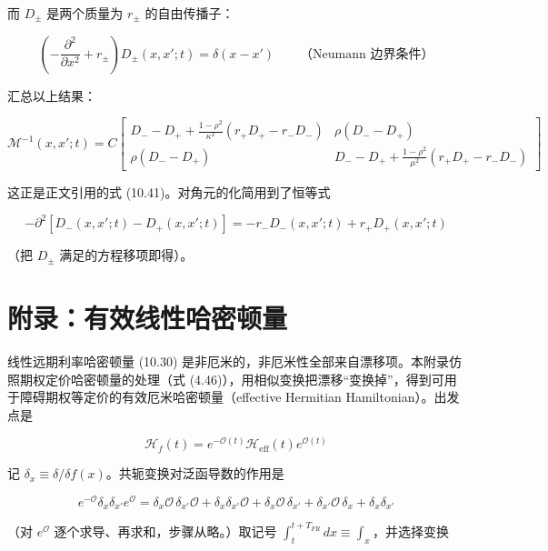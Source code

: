 而 $D_\pm$ 是两个质量为 $r_\pm$ 的自由传播子：

\begin{equation*}
\left(-\frac{\partial^2}{\partial x^2}+r_\pm\right)D_\pm(x,x';t)=\delta(x-x')\qquad\text{（Neumann 边界条件）}
\end{equation*}

汇总以上结果：

\begin{equation*}
\mathcal{M}^{-1}(x,x';t)=
C\begin{bmatrix}
D_--D_+ + \frac{1-\rho^2}{\kappa^2}(r_+D_+-r_-D_-) & \rho(D_--D_+)\\[6pt]
\rho(D_--D_+) & D_--D_+ + \frac{1-\rho^2}{\mu^2}(r_+D_+-r_-D_-)
\end{bmatrix}
\tag{10.73}
\end{equation*}

这正是正文引用的式 (10.41)。对角元的化简用到了恒等式

\begin{equation*}
-\partial^2\left[D_-(x,x';t)-D_+(x,x';t)\right]=-r_-D_-(x,x';t)+r_+D_+(x,x';t)
\end{equation*}

（把 $D_\pm$ 满足的方程移项即得）。

\section{附录：有效线性哈密顿量}

线性远期利率哈密顿量 (10.30) 是非厄米的，非厄米性全部来自漂移项。本附录仿照期权定价哈密顿量的处理（式 (4.46)），用相似变换把漂移“变换掉”，得到可用于障碍期权等定价的有效厄米哈密顿量（effective Hermitian Hamiltonian）。出发点是

\begin{equation*}
\mathcal{H}_f(t)=e^{-\mathcal{O}(t)}\mathcal{H}_{\text{eff}}(t)e^{\mathcal{O}(t)}
\tag{10.74}
\end{equation*}

记 $\delta_x\equiv\delta/\delta f(x)$。共轭变换对泛函导数的作用是

\begin{equation*}
e^{-\mathcal{O}}\delta_x\delta_{x'}e^{\mathcal{O}}
=\delta_x\mathcal{O}\,\delta_{x'}\mathcal{O}+\delta_x\delta_{x'}\mathcal{O}+\delta_x\mathcal{O}\,\delta_{x'}+\delta_{x'}\mathcal{O}\,\delta_x+\delta_x\delta_{x'}
\end{equation*}

（对 $e^{\mathcal{O}}$ 逐个求导、再求和，步骤从略。）取记号 $\int_t^{t+T_{FR}}dx\equiv\int_x$，并选择变换


